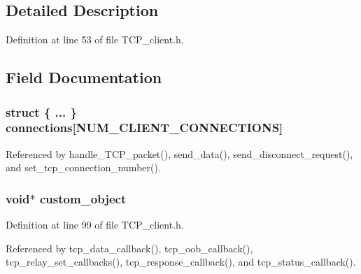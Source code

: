 \subsection{Detailed Description}


Definition at line 53 of file T\+C\+P\+\_\+client.\+h.



\subsection{Field Documentation}
\hypertarget{struct_t_c_p___client___connection_a5b7b7af3e8287597e380502eb776cd7a}{
\subsubsection[{connections}]{\setlength{\rightskip}{0pt plus 5cm}struct \{ ... \}   connections\mbox{[}{\bf N\+U\+M\+\_\+\+C\+L\+I\+E\+N\+T\+\_\+\+C\+O\+N\+N\+E\+C\+T\+I\+O\+N\+S}\mbox{]}}}\label{struct_t_c_p___client___connection_a5b7b7af3e8287597e380502eb776cd7a}


Referenced by handle\+\_\+\+T\+C\+P\+\_\+packet(), send\+\_\+data(), send\+\_\+disconnect\+\_\+request(), and set\+\_\+tcp\+\_\+connection\+\_\+number().

\hypertarget{struct_t_c_p___client___connection_a5166a2d34403f1dafd1f23602df6c759}{
\subsubsection[{custom\+\_\+object}]{\setlength{\rightskip}{0pt plus 5cm}void$\ast$ custom\+\_\+object}}\label{struct_t_c_p___client___connection_a5166a2d34403f1dafd1f23602df6c759}


Definition at line 99 of file T\+C\+P\+\_\+client.\+h.



Referenced by tcp\+\_\+data\+\_\+callback(), tcp\+\_\+oob\+\_\+callback(), tcp\+\_\+relay\+\_\+set\+\_\+callbacks(), tcp\+\_\+response\+\_\+callback(), and tcp\+\_\+status\+\_\+callback().

